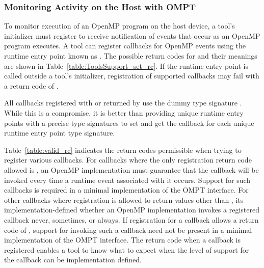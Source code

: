 \subsubsection{Monitoring Activity on the Host with OMPT}
\label{sec:ompt-register-callbacks}

To monitor execution of an OpenMP program on the host device, a tool's
initializer must register to receive notification
of events that occur as an OpenMP program executes.  
A tool can register callbacks for OpenMP events using
the runtime entry point known as 
.  The possible return codes for
 and their meanings are shown in
Table~\ref{table:ToolsSupport_set_rc}.  
If the  runtime entry point is
called outside a tool's initializer, registration of supported
callbacks may fail with a return code of . 

All callbacks registered with  or returned
by  use the dummy type signature
.  While this is a compromise, it is better
than providing unique runtime entry points with a precise type signatures to
set and get the callback for each unique runtime entry point type signature.

Table~\ref{table:valid_rc} indicates the return codes permissible
when trying to register various callbacks. For callbacks where the only registration return code
allowed is , an
OpenMP implementation must guarantee that the callback will be
invoked every time a runtime event associated with it occurs. Support
for such callbacks is required in a minimal implementation of the
OMPT interface. For other callbacks where registration is allowed to return values
other than , its implementation-defined
whether an OpenMP implementation invokes a registered callback
never, sometimes, or always. If registration for a callback allows 
a return code of , support for invoking such 
a callback need not be present in a minimal implementation of the 
OMPT interface.  The return code when a callback is
registered enables a tool to know what to expect when the level
of support for the callback can be implementation defined.



